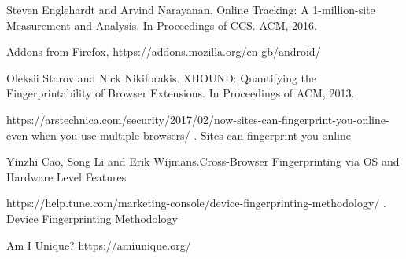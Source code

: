 \documentclass[journal]{IEEEtran}
\begin{document}






%
%
%
\begin{thebibliography}{1}

Steven Englehardt and Arvind Narayanan. Online Tracking: A 1-million-site
Measurement and Analysis. In Proceedings of CCS. ACM,
2016.

Addons from Firefox, https://addons.mozilla.org/en-gb/android/

Oleksii Starov and Nick Nikiforakis. XHOUND: Quantifying the Fingerprintability of Browser Extensions. In Proceedings of ACM, 2013.
  
https://arstechnica.com/security/2017/02/now-sites-can-fingerprint-you-online-even-when-you-use-multiple-browsers/ . Sites can fingerprint you online
 
Yinzhi Cao, Song Li and Erik Wijmans.Cross-Browser Fingerprinting via OS and Hardware Level Features
  
https://help.tune.com/marketing-console/device-fingerprinting-methodology/ . Device
Fingerprinting Methodology
  
Am I Unique? https://amiunique.org/
  

\end{thebibliography}
\end{document}
